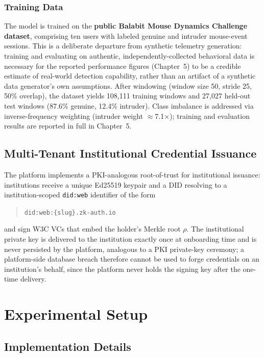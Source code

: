 \documentclass[12pt,a4paper,oneside]{report}
\begin{document}
\subsection{Training Data}

The model is trained on the \textbf{public Balabit Mouse Dynamics
Challenge dataset}, comprising ten users with labeled genuine and
intruder mouse-event sessions. This is a deliberate departure from
synthetic telemetry generation: training and evaluating on authentic,
independently-collected behavioral data is necessary for the reported
performance figures (Chapter~5) to be a credible estimate of real-world
detection capability, rather than an artifact of a synthetic data
generator's own assumptions. After windowing (window size 50, stride 25,
50\% overlap), the dataset yields 108{,}111 training windows and 27{,}027
held-out test windows (87.6\% genuine, 12.4\% intruder). Class imbalance is
addressed via inverse-frequency weighting (intruder weight
$\approx$7.1$\times$); training and evaluation results are reported in
full in Chapter~5.

\section{Multi-Tenant Institutional Credential Issuance}

The platform implements a PKI-analogous root-of-trust for institutional
issuance: institutions receive a unique Ed25519 keypair and a DID
resolving to a institution-scoped \texttt{did:web} identifier of the form
\begin{quote}
\texttt{did:web:\{slug\}.zk-auth.io}
\end{quote}
and sign W3C VCs that
embed the holder's Merkle root $\rho$. The institutional private key is
delivered to the institution exactly once at onboarding time and is never
persisted by the platform, analogous to a PKI private-key ceremony; a
platform-side database breach therefore cannot be used to forge
credentials on an institution's behalf, since the platform never holds
the signing key after the one-time delivery.

\chapter{Experimental Setup}

\section{Implementation Details}
\end{document}
